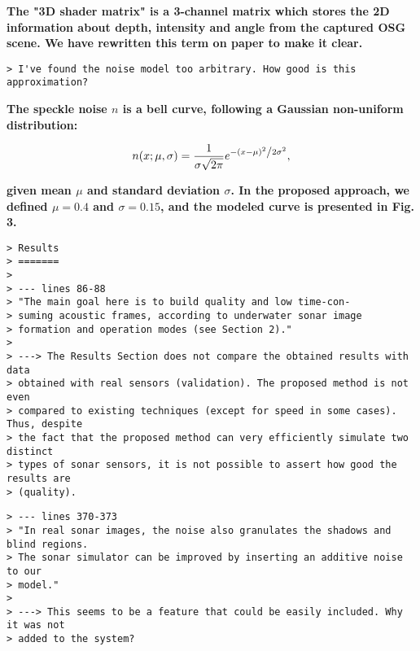 \documentclass{article}
\begin{document}
\textbf{The "3D shader matrix" is a 3-channel matrix which stores the 2D information
about depth, intensity and angle from the captured OSG scene. We have rewritten this
term on paper to make it clear.}

\begin{verbatim}
> I've found the noise model too arbitrary. How good is this approximation?
\end{verbatim}

\textbf{The speckle noise $n$ is a bell curve, following a Gaussian non-uniform
distribution:}

\begin{equation*}
n(x;\mu,\sigma) = \frac{1}{{\sigma \sqrt {2\pi } }}e^{{{ - \left( {x - \mu } \right)^2 } \mathord{\left/ {\vphantom {{ - \left( {x - \mu } \right)^2 } {2\sigma ^2 }}} \right. \kern-\nulldelimiterspace} {2\sigma ^2 }}},
\end{equation*}

\textbf{given mean $\mu$ and standard deviation $\sigma$. In the proposed approach,
we defined $\mu = 0.4$ and $\sigma = 0.15$, and the modeled curve is presented in Fig. 3.}

\begin{verbatim}
> Results
> =======
>
> --- lines 86-88
> "The main goal here is to build quality and low time-con-
> suming acoustic frames, according to underwater sonar image
> formation and operation modes (see Section 2)."
>
> ---> The Results Section does not compare the obtained results with data
> obtained with real sensors (validation). The proposed method is not even
> compared to existing techniques (except for speed in some cases). Thus, despite
> the fact that the proposed method can very efficiently simulate two distinct
> types of sonar sensors, it is not possible to assert how good the results are
> (quality).
\end{verbatim}


\begin{verbatim}
> --- lines 370-373
> "In real sonar images, the noise also granulates the shadows and blind regions.
> The sonar simulator can be improved by inserting an additive noise to our
> model."
>
> ---> This seems to be a feature that could be easily included. Why it was not
> added to the system?

\end{verbatim}
\end{document}
